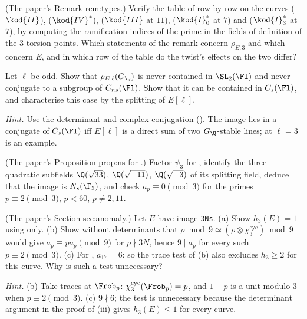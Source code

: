 \begin{exercise}\label{ex:galrep:types-rows}
(The paper's Remark rem:types.) Verify the table of  row by row on the curves  ($\kod{II}$),  ($\kod{IV}^*$),
 ($\kod{III}$ at $11$),  ($\kod{I}_0^*$ at $7$) and  ($\kod{I}_3^*$ at $7$), by computing the ramification indices of the prime in the fields of
definition of the $3$-torsion points. Which statements of the remark concern $\bar\rho_{E,3}$ and which concern $E$, and in which row of the table
do the twist's effects on the two differ?
\end{exercise}

\begin{exercise}\label{ex:galrep:cns}
Let $\ell$ be odd. Show that $\bar\rho_{E,\ell}(G_\Q)$ is never contained in $\SL_2(\Fl)$ and never conjugate to a subgroup of $C_{ns}(\Fl)$. Show that it can be contained in
$C_s(\Fl)$, and characterise this case by the splitting of $E[\ell]$.

\emph{Hint.} Use the determinant and complex conjugation (). The image lies in a conjugate of $C_s(\Fl)$ iff $E[\ell]$ is a direct
sum of two $G_\Q$-stable lines;  at $\ell=3$ is an example.
\end{exercise}

\begin{exercise}\label{ex:galrep:726a1}
(The paper's Proposition prop:ns for .) Factor $\psi_3$ for , identify the three quadratic subfields $\Q(\sqrt{33})$, $\Q(\sqrt{-11})$, $\Q(\sqrt{-3})$ of
its splitting field, deduce that the image is $N_s(\F_3)$, and check $a_p\equiv0\pmod3$ for the primes $p\equiv2\pmod3$, $p<60$, $p\ne2,11$.
\end{exercise}

\begin{exercise}\label{ex:galrep:h3-traces}
(The paper's Section sec:anomaly.) Let $E$ have image \texttt{3Ns}. (a) Show $h_3(E)=1$ using  only. (b) Show without determinants that
$\rho\bmod9\simeq(\rho\otimes\chi_3^{\mathrm{cyc}})\bmod9$ would give $a_p\equiv pa_p\pmod9$ for $p\nmid3N$, hence $9\mid a_p$ for every such $p\equiv2\pmod3$. (c) For , $a_{17}=6$: so the trace
test of (b) also excludes $h_3\ge2$ for this curve. Why is such a test unnecessary?

\emph{Hint.} (b) Take traces at $\Frob_p$: $\chi_3^{\mathrm{cyc}}(\Frob_p)=p$, and $1-p$ is a unit modulo $3$ when $p\equiv2\pmod3$. (c) $9\nmid6$; the test is unnecessary
because the determinant argument in the proof of (iii) gives $h_3(E)\le1$ for every curve.
\end{exercise}

